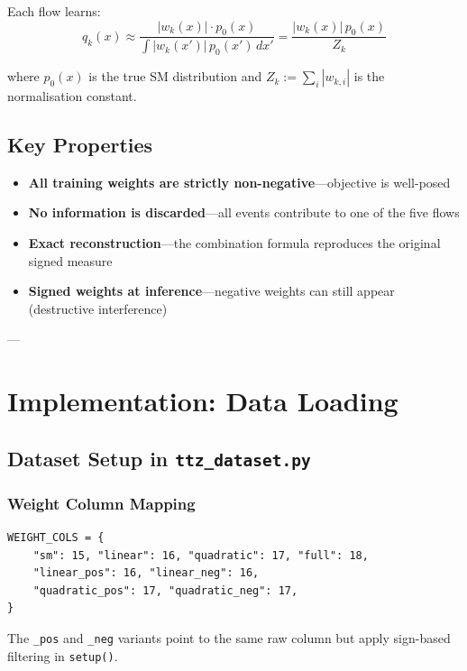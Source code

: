 \documentclass[11pt,a4paper]{article}
\begin{document}
\noindent Each flow learns:
\begin{equation}
q_k(x) \approx \frac{|w_k(x)| \cdot p_0(x)}{\int |w_k(x')| \, p_0(x') \, dx'} = \frac{|w_k(x)| \, p_0(x)}{Z_k}
\end{equation}

where $p_0(x)$ is the true SM distribution and $Z_k := \sum_i |w_{k,i}|$ is the normalisation constant.

\subsection{Key Properties}

\begin{itemize}
  \item \textbf{All training weights are strictly non-negative}—objective is well-posed
  \item \textbf{No information is discarded}—all events contribute to one of the five flows
  \item \textbf{Exact reconstruction}—the combination formula reproduces the original signed measure
  \item \textbf{Signed weights at inference}—negative weights can still appear (destructive interference)
\end{itemize}

---

\section{Implementation: Data Loading}

\subsection{Dataset Setup in \texttt{ttz\_dataset.py}}

\subsubsection{Weight Column Mapping}

\begin{lstlisting}
WEIGHT_COLS = {
    "sm": 15, "linear": 16, "quadratic": 17, "full": 18,
    "linear_pos": 16, "linear_neg": 16,
    "quadratic_pos": 17, "quadratic_neg": 17,
}
\end{lstlisting}

The \texttt{\_pos} and \texttt{\_neg} variants point to the same raw column but apply sign-based filtering in \texttt{setup()}.
\end{document}
